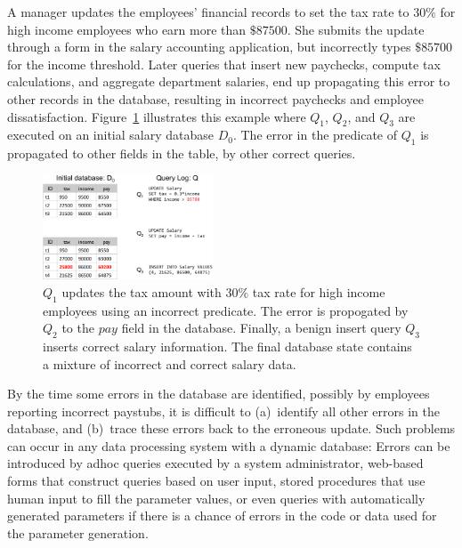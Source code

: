 {\color{blue}
\begin{example}\label{ex:telco}
  A manager updates the employees' financial records to set the tax rate to $30\%$ for high income employees who earn more than $\$87500$.
  She submits the update through a form in the salary accounting application, 
  but incorrectly types $\$85700$ for the income threshold.  
  Later queries that insert new paychecks, compute tax calculations, and
  aggregate department salaries, end up propagating this error to other records in the database, resulting in incorrect paychecks and
  employee dissatisfaction.  Figure~\ref{fig:example} illustrates this example where $Q_1$, $Q_2$, and $Q_3$ are executed on an 
  initial salary database $D_0$.  The error in the predicate of $Q_1$ is propagated to other fields in the table, by other correct queries.
\end{example}

\begin{figure}[t]
    \centering
        \includegraphics[width=0.45\textwidth]{figures/example2}
    \caption{$Q_1$ updates the tax amount with $30\%$ tax rate 
      for high income employees using an incorrect predicate.  
      The error is propogated by $Q_2$ to the $pay$ field in the database.
      Finally, a benign insert query $Q_3$ inserts correct salary information. 
      The final database state contains a mixture of incorrect and correct salary data.
    }
    \label{fig:example}
\end{figure}


By the time some errors in the database are identified, possibly by
employees reporting incorrect paystubs, it is difficult to
(a)~identify all other errors in the database, and (b)~trace these
errors back to the erroneous update. Such problems can occur in any
data processing system with a dynamic database: Errors can be
introduced by adhoc queries executed by a system administrator,
web-based forms that construct queries based on user input, stored
procedures that use human input to fill the parameter values, or even
queries with automatically generated parameters if there is a chance of
errors in the code or data used for the parameter generation.
}
